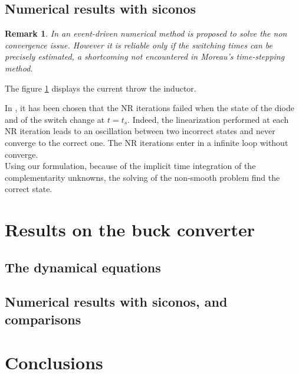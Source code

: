 \documentclass{article}
\newtheorem{remark}{Remark}
\begin{document}
\subsection{Numerical results with {\sc siconos}}
\label{section32}


\begin{remark}
In \cite{maffezzoni2006} an event-driven numerical method is proposed to solve the non convergence issue. However it is reliable only if the switching times can be precisely estimated, a shortcoming not encountered  in Moreau's time-stepping method. 
\end{remark}

The figure \ref{fig:SIMU_CS} displays the current throw the inductor.

 \begin{figure}[h]
   
  \label{fig:SIMU_CS}
 \end{figure}

 In \cite{maffezzoni2006}, it has been chosen that the NR iterations failed when the state of the
 diode and of the switch change at $t=t_s$. Indeed, the linearization performed at each NR iteration leads to an oscillation between two incorrect
 states and never converge to the correct one. The NR iterations enter in a infinite loop without converge. \\
 Using our formulation, because of the implicit time integration of the complementarity unknowns, the solving of the non-smooth problem find the correct state.

 

\section{Results on the buck converter}
\label{section4}


\subsection{The dynamical equations}
\label{section41}


\subsection{Numerical results with {\sc siconos},  and comparisons}
\label{section42}



\section{Conclusions}
\label{section5}
\end{document}
